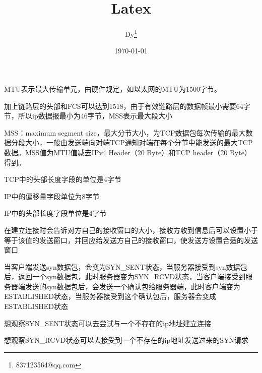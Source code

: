 \documentclass[12pt,a4paper]{article}
\begin{document}
\begin{CJK}{UTF8}{gbsn}

\author{Dy\footnote{837123564@qq.com}}
\title{Latex}
\date{\today}
\maketitle
\thispagestyle{empty} %
\newpage
\tableofcontents

\newpage
MTU表示最大传输单元，由硬件规定，如以太网的MTU为1500字节。

加上链路层的头部和FCS可以达到1518，由于有效链路层的数据帧最小需要64字节，所以ip数据报最小为46字节，MSS表示最大段大小

MSS：maximum segment size，最大分节大小，为TCP数据包每次传输的最大数据分段大小，一般由发送端向对端TCP通知对端在每个分节中能发送的最大TCP数据。MSS值为MTU值减去IPv4 Header（20 Byte）和TCP header（20 Byte）得到。

TCP中的头部长度字段的单位是4字节

IP中的偏移量字段单位为8字节

IP中的头部长度字段单位是4字节

在建立连接时会告诉对方自己的接收窗口的大小，接收方收到信息后可以设置小于等于该值的发送窗口，并回应给发送方自己的接收窗口，使发送方设置合适的发送窗口

当客户端发送syn数据包，会变为SYN\_SENT状态，当服务器接受到syn数据包后，返回一个syn数据包，此时服务器变为SYN\_RCVD状态，当客户端接受到服务器端发送的syn数据包后，会发送一个确认包给服务器端，此时客户端变为ESTABLISHED状态，当服务器接受到这个确认包后，服务器会变成ESTABLISHED状态

想观察SYN\_SENT状态可以去尝试与一个不存在的ip地址建立连接

想观察SYN\_RCVD状态可以去接受到一个不存在的ip地址发送过来的SYN请求

\end{CJK}
\end{document}
